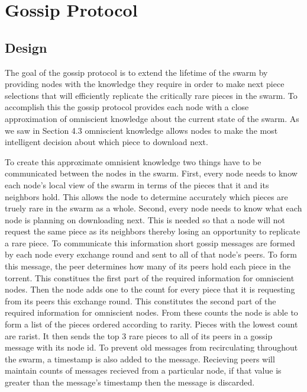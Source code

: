 \section{Gossip Protocol}

\subsection{Design}

The goal of the gossip protocol is to extend the lifetime of the swarm
by providing nodes with the knowledge they require in order to make
next piece selections that will efficiently replicate the critically
rare pieces in the swarm. To accomplish this the gossip protocol
provides each node with a close approximation of omniscient knowledge
about the current state of the swarm. As we saw in Section 4.3
omniscient knowledge allows nodes to make the most intelligent
decision about which piece to download next. 

To create this approximate omnisient knowledge two things have to be
communicated between the nodes in the swarm. First, every node needs
to know each node's local view of the swarm in terms of the pieces
that it and its neighbors hold. This allows the node to determine
accurately which pieces are truely rare in the swarm as a whole. Second, every
node needs to know what each node is planning on downloading
next. This is needed so that a node will not request the same piece as
its neighbors thereby losing an opportunity to replicate a rare
piece. To communicate this information short gossip messages are
formed by each node every exchange round and sent to all of that
node's peers. To form this message, the peer determines how many of
its peers hold each piece in the torrent. This constitues the first
part of the required information for omniscient nodes. Then the node
adds one to the count for every piece that it is requesting from its
peers this exchange round. This constitutes the second part of the
required information for omniscient nodes. From these counts the node
is able to form a list of the pieces ordered according to rarity.
Pieces with the lowest count are rarist. It then sends the top 3 rare
pieces to all of its peers in a gossip message with its node id. To
prevent old messages from recirculating throughout the swarm, a
timestamp is also added to the message. Recieving peers will maintain
counts of messages recieved from a particular node, if that value is
greater than the message's timestamp then the message is discarded.


